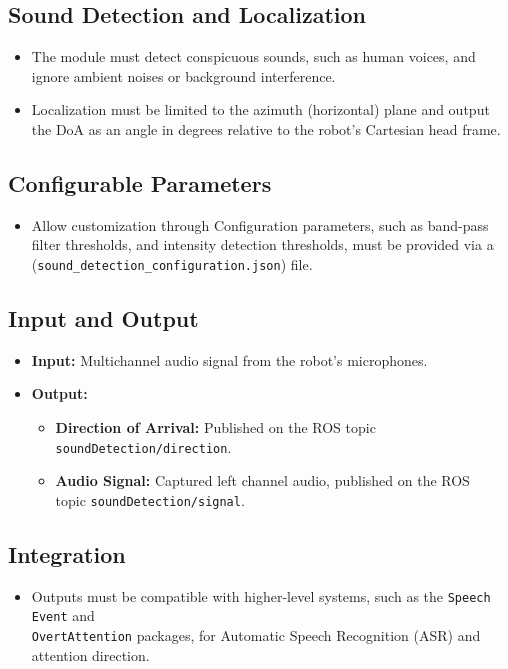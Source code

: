 \documentclass{CSSRforAfrica}
\begin{document}
\subsection*{Sound Detection and Localization}
\begin{itemize}
	\item The module must detect conspicuous sounds, such as human voices, and ignore ambient noises or background interference.
	\item Localization must be limited to the azimuth (horizontal) plane and output the DoA as an angle in degrees relative to the robot's Cartesian head frame.
\end{itemize}

\subsection*{Configurable Parameters}
\begin{itemize}
	\item Allow customization through Configuration parameters, such as band-pass filter thresholds, and intensity detection thresholds, must be provided via a (\texttt{sound\_detection\_configuration.json}) file.
\end{itemize}

\subsection*{Input and Output}
\begin{itemize}
	\item \textbf{Input:} Multichannel audio signal from the robot’s microphones.
	\item \textbf{Output:}
	\begin{itemize}
		\item \textbf{Direction of Arrival:} Published on the ROS topic \texttt{soundDetection/direction}.
		\item \textbf{Audio Signal:} Captured left channel audio, published on the ROS \\ topic \texttt{soundDetection/signal}.
	\end{itemize}
\end{itemize}
	
\subsection*{Integration}
\begin{itemize}
	\item Outputs must be compatible with higher-level systems, such as the \texttt{Speech Event} and \\ 
	\texttt{OvertAttention} packages, for Automatic Speech Recognition (ASR) and attention direction.
\end{itemize}
\end{document}
